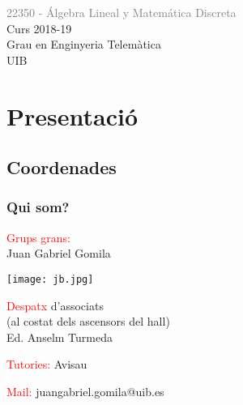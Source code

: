\documentclass[12pt,t]{beamer}
\title[\red{22350 - Álgebra Lineal y Matemática Discreta}]{}
\author[]{Juan Gabriel Gomila}
\date{}
\newcommand{\red}[1]{\textcolor{red}{#1}}
\newcommand{\gray}[1]{\textcolor{gray}{#1}}
\theoremstyle{plain}
\theoremstyle{definition}
\begin{document}
\beamertemplatedotitem


\lstset{breaklines=true}
\lstset{basicstyle=\ttfamily}


\begin{frame}
\vfill
\begin{center}
\gray{\Huge 22350 - Álgebra Lineal y Matemática Discreta}\\[3ex]
\Large Curs 2018-19\\
Grau en Enginyeria Telemàtica\\
UIB
\end{center}
\vfill
\end{frame}

\section{Presentació}

\subsection{Coordenades}


\begin{frame}
\frametitle{Qui som?}
\vspace*{-0.2cm}
\centering
\begin{minipage}[c]{0.45\linewidth}
\small \begin{center}
\red{Grups grans:}\\
  Juan Gabriel Gomila\\
\medskip

\texttt{[image: jb.jpg]}\\
\medskip

\red{Despatx} d'associats \\
(al costat dels ascensors del hall)\\
 Ed. Anselm Turmeda
\medskip

\red{Tutories:} Avisau\medskip

\red{Mail:} juangabriel.gomila@uib.es
\end{center}
\end{minipage}



\end{frame}
\end{document}
